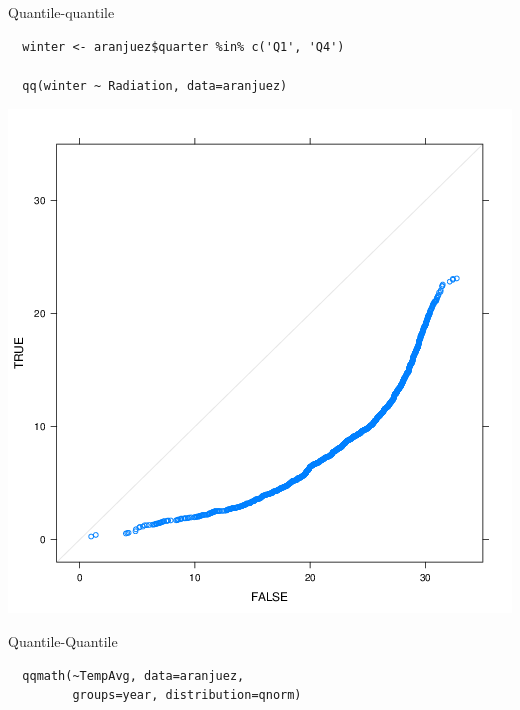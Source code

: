 \documentclass[xcolor={usenames,svgnames,dvipsnames}]{beamer}
\begin{document}
\begin{frame}[fragile,label={sec:orgheadline59}]{Quantile-quantile}
 \lstset{language=R,label= ,caption= ,captionpos=b,numbers=none}
\begin{lstlisting}
  winter <- aranjuez$quarter %in% c('Q1', 'Q4')
  
  qq(winter ~ Radiation, data=aranjuez)
\end{lstlisting}
\end{frame}

\begin{frame}[label={sec:orgheadline60}]{}
\includegraphics[width=.9\linewidth]{figs/qqWinter.png}
\end{frame}

\begin{frame}[fragile,label={sec:orgheadline61}]{Quantile-Quantile}
 \lstset{language=R,label= ,caption= ,captionpos=b,numbers=none}
\begin{lstlisting}
  qqmath(~TempAvg, data=aranjuez,
         groups=year, distribution=qnorm)
\end{lstlisting}
\end{frame}
\end{document}
